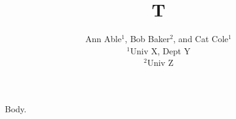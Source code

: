 \documentclass{article}
\title{T}
\author{Ann Able$^{1}$, Bob Baker$^{2}$\footremember{zz}{Zebra note.}, and Cat Cole$^{1}$\\
$^{1}$Univ X, Dept Y\\ $^{2}$Univ Z}
\begin{document}
\maketitle
Body.
\end{document}
